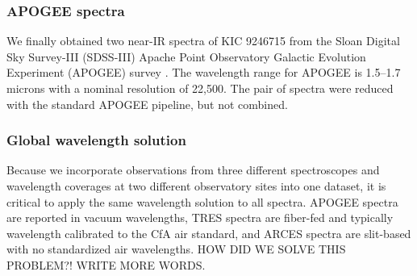 \subsubsection{APOGEE spectra}\label{apogee}
We finally obtained two near-IR spectra of KIC 9246715 from the Sloan Digital Sky Survey-III (SDSS-III) Apache Point Observatory Galactic Evolution Experiment (APOGEE) survey \citep{2015arXiv150100963A}. The wavelength range for APOGEE is 1.5--1.7 microns with a nominal resolution of 22,500. The pair of spectra were reduced with the standard APOGEE pipeline, but not combined.

\subsubsection{Global wavelength solution}\label{wavelength}
Because we incorporate observations from three different spectroscopes and wavelength coverages at two different observatory sites into one dataset, it is critical to apply the same wavelength solution to all spectra. APOGEE spectra are reported in vacuum wavelengths, TRES spectra are fiber-fed and typically wavelength calibrated to the CfA air standard, and ARCES spectra are slit-based with no standardized air wavelengths. HOW DID WE SOLVE THIS PROBLEM?! WRITE MORE WORDS.